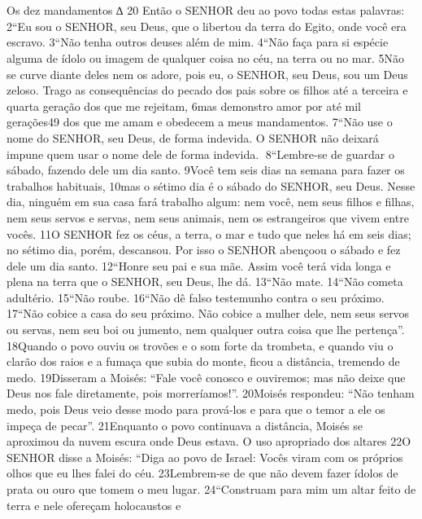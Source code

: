 \section*{}

Os dez mandamentos
∆   20 Então o SENHOR deu ao povo todas estas palavras:
2“Eu  sou o SENHOR, seu Deus, que o libertou da terra do Egito, onde você era
 escravo.
3“Não tenha outros deuses além de mim.
4“Não faça para si espécie alguma de ídolo ou imagem de qualquer coisa no céu,
 na terra ou no mar. 5Não se curve diante deles nem os adore, pois eu, o SENHOR,
 seu Deus, sou um Deus zeloso. Trago as consequências do pecado dos pais sobre
 os filhos até a terceira e quarta geração dos que me rejeitam, 6mas demonstro
 amor por até mil gerações49 dos que me amam e obedecem a meus
 mandamentos.
7“Não use o nome do SENHOR, seu Deus, de forma indevida. O SENHOR não deixará
 impune quem usar o nome dele de forma indevida.
8“Lembre-se de guardar o sábado, fazendo dele um dia santo. 9Você tem seis dias
 na semana para fazer os trabalhos habituais, 10mas o sétimo dia é o sábado do
 SENHOR, seu Deus. Nesse dia, ninguém em sua casa fará trabalho algum: nem
 você, nem seus filhos e filhas, nem seus servos e servas, nem seus animais, nem
 os estrangeiros que vivem entre vocês. 11O SENHOR fez os céus, a terra, o mar e
 tudo que neles há em seis dias; no sétimo dia, porém, descansou. Por isso o
 SENHOR abençoou o sábado e fez dele um dia santo.
12“Honre seu pai e sua mãe. Assim você terá vida longa e plena na terra que o
 SENHOR, seu Deus, lhe dá.
13“Não mate.
14“Não cometa adultério.
15“Não roube.
16“Não dê falso testemunho contra o seu próximo.
17“Não cobice a casa do seu próximo. Não cobice a mulher dele, nem seus servos
 ou servas, nem seu boi ou jumento, nem qualquer outra coisa que lhe pertença”.
  18Quando    o povo ouviu os trovões e o som forte da trombeta, e quando viu o
clarão dos raios e a fumaça que subia do monte, ficou a distância, tremendo de
medo.
   19Disseram a Moisés: “Fale você conosco e ouviremos; mas não deixe que Deus
nos fale diretamente, pois morreríamos!”.
   20Moisés respondeu: “Não tenham medo, pois Deus veio desse modo para
prová-los e para que o temor a ele os impeça de pecar”.
   21Enquanto o povo continuava a distância, Moisés se aproximou da nuvem
escura onde Deus estava.
O uso apropriado dos altares
22O SENHOR disse a Moisés: “Diga ao povo de Israel: Vocês viram com os próprios
olhos que eu lhes falei do céu. 23Lembrem-se de que não devem fazer ídolos de
prata ou ouro que tomem o meu lugar.
  24“Construam para mim um altar feito de terra e nele ofereçam holocaustos e
